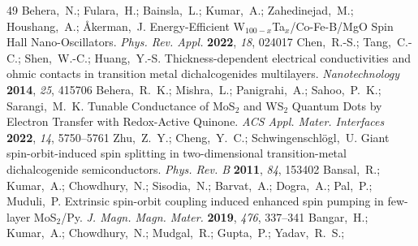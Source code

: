 \documentclass[journal=jacsat,manuscript=article]{achemso}
\begin{document}
\begin{mcitethebibliography}{49}
Behera,~N.; Fulara,~H.; Bainsla,~L.; Kumar,~A.; Zahedinejad,~M.; Houshang,~A.;
  {\AA}kerman,~J. Energy-Efficient W$_{100- x}$Ta$_x$/Co-Fe-B/MgO Spin Hall
  Nano-Oscillators. \emph{Phys. Rev. Appl.} \textbf{2022}, \emph{18},
  024017\relax
\mciteBstWouldAddEndPuncttrue
\mciteSetBstMidEndSepPunct{\mcitedefaultmidpunct}
{\mcitedefaultendpunct}{\mcitedefaultseppunct}\relax
\EndOfBibitem
{}
Chen,~R.-S.; Tang,~C.-C.; Shen,~W.-C.; Huang,~Y.-S. Thickness-dependent
  electrical conductivities and ohmic contacts in transition metal
  dichalcogenides multilayers. \emph{Nanotechnology} \textbf{2014}, \emph{25},
  415706\relax
\mciteBstWouldAddEndPuncttrue
\mciteSetBstMidEndSepPunct{\mcitedefaultmidpunct}
{\mcitedefaultendpunct}{\mcitedefaultseppunct}\relax
\EndOfBibitem
{}
Behera,~R.~K.; Mishra,~L.; Panigrahi,~A.; Sahoo,~P.~K.; Sarangi,~M.~K. Tunable
  Conductance of MoS$_2$ and WS$_2$ Quantum Dots by Electron Transfer with
  Redox-Active Quinone. \emph{ACS Appl. Mater. Interfaces} \textbf{2022},
  \emph{14}, 5750--5761\relax
\mciteBstWouldAddEndPuncttrue
\mciteSetBstMidEndSepPunct{\mcitedefaultmidpunct}
{\mcitedefaultendpunct}{\mcitedefaultseppunct}\relax
\EndOfBibitem
{}
Zhu,~Z.~Y.; Cheng,~Y.~C.; Schwingenschl{\"o}gl,~U. Giant spin-orbit-induced
  spin splitting in two-dimensional transition-metal dichalcogenide
  semiconductors. \emph{Phys. Rev. B} \textbf{2011}, \emph{84}, 153402\relax
\mciteBstWouldAddEndPuncttrue
\mciteSetBstMidEndSepPunct{\mcitedefaultmidpunct}
{\mcitedefaultendpunct}{\mcitedefaultseppunct}\relax
\EndOfBibitem
{}
Bansal,~R.; Kumar,~A.; Chowdhury,~N.; Sisodia,~N.; Barvat,~A.; Dogra,~A.;
  Pal,~P.; Muduli,~P. {Extrinsic spin-orbit coupling induced enhanced spin
  pumping in few-layer MoS$_2$/Py}. \emph{J. Magn. Magn. Mater.} \textbf{2019},
  \emph{476}, 337--341\relax
\mciteBstWouldAddEndPuncttrue
\mciteSetBstMidEndSepPunct{\mcitedefaultmidpunct}
{\mcitedefaultendpunct}{\mcitedefaultseppunct}\relax
\EndOfBibitem
{}
Bangar,~H.; Kumar,~A.; Chowdhury,~N.; Mudgal,~R.; Gupta,~P.; Yadav,~R.~S.;

\end{mcitethebibliography}
\end{document}

